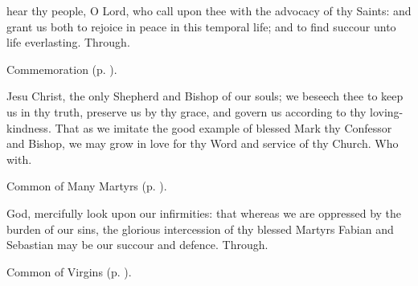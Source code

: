 
\memorialCollect
{} hear thy people, O Lord, who call upon thee with the advocacy of thy Saints: and grant us both to rejoice in peace in this temporal life; and to find succour unto life everlasting. Through.

\begin{rubric}
    Commemoration  (p. \pageref{EphesianCollect}).
\end{rubric}



\memorialCollect\label{EphesianCollect}
 Jesu Christ, the only Shepherd and Bishop of our souls; we beseech thee to keep us in thy truth, preserve us by thy grace, and govern us according to thy loving-kindness. That as we imitate the good example of blessed Mark thy Confessor and Bishop, we may grow in love for thy Word and service of thy Church. Who with.



\clearpage
{}

\begin{rubric}
	Common of Many Martyrs (p. \pageref{CommonMartyrs}).
\end{rubric}

{} God, mercifully look upon our infirmities: that whereas we are oppressed by the burden of our sins, the glorious intercession of thy blessed Martyrs Fabian and Sebastian may be our succour and defence. Through.



\begin{rubric}
	Common of Virgins (p. \pageref{CommonVirgin}).
\end{rubric}


